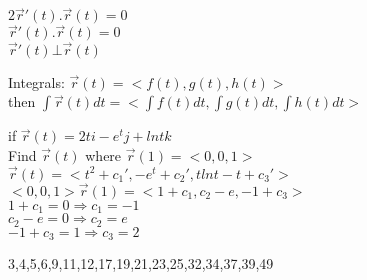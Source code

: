 $2\overrightarrow{r}'(t).\overrightarrow{r}(t)=0$\\
$\overrightarrow{r}'(t).\overrightarrow{r}(t)=0$\\
$\overrightarrow{r}'(t)\bot \overrightarrow{r}(t)$
\begin{definition}
Integrals:
$\overrightarrow{r}(t)=<f(t),g(t),h(t)>$\\
then $\int\overrightarrow{r}(t)dt=<\int f(t)dt,\int g(t)dt,\int h(t)dt>$
\end{definition}
\noindent{\color{smalt(darkpowderblue)}\rule{\linewidth}{.2mm}}
\begin{example}
if $\overrightarrow{r}(t)=2ti-e^tj+lnt k$\\
Find $\overrightarrow{r}(t)$ where $\overrightarrow{r}(1)=<0,0,1>$
$\overrightarrow{r}(t)=<t^2+c_1',-e^t+c_2',tlnt-t+c_3'>$
$<0,0,1>\overrightarrow{r}(1)=<1+c_1,c_2-e,-1+c_3>$\\
$1+c_1=0\Rightarrow c_1=-1$\\
$c_2-e=0\Rightarrow c_2=e$\\
$-1+c_3=1\Rightarrow c_3=2$
\end{example}
\noindent{\color{smalt(darkpowderblue)}\rule{\linewidth}{.2mm}}
\begin{problem}
3,4,5,6,9,11,12,17,19,21,23,25,32,34,37,39,49
\end{problem}
